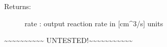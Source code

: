 \documentclass[letterpaper,10pt,english]{sphinxmanual}
\begin{document}
\begin{fulllineitems}
\begin{description}
\begin{description}
\end{description}

\item[{Returns:}] \leavevmode
rate : output reaction rate in {[}cm\textasciicircum{}3/s{]} units

\end{description}

\textasciitilde{}\textasciitilde{}\textasciitilde{}\textasciitilde{}\textasciitilde{}\textasciitilde{}\textasciitilde{}\textasciitilde{}\textasciitilde{}\textasciitilde{} UNTESTED!\textasciitilde{}\textasciitilde{}\textasciitilde{}\textasciitilde{}\textasciitilde{}\textasciitilde{}\textasciitilde{}\textasciitilde{}\textasciitilde{}\textasciitilde{}\textasciitilde{}

\end{fulllineitems}

\end{document}
